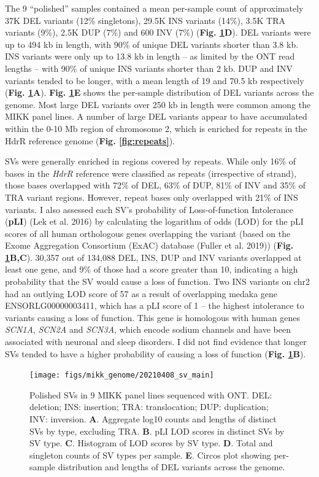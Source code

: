 \documentclass[
]{book}
\begin{document}
The 9 ``polished'' samples contained a mean per-sample count of approximately 37K DEL variants (12\% singletons), 29.5K INS variants (14\%), 3.5K TRA variants (9\%), 2.5K DUP (7\%) and 600 INV (7\%) (\textbf{Fig. \ref{fig:SV-main}D}). DEL variants were up to 494 kb in length, with 90\% of unique DEL variants shorter than 3.8 kb. INS variants were only up to 13.8 kb in length -- as limited by the ONT read lengths -- with 90\% of unique INS variants shorter than 2 kb. DUP and INV variants tended to be longer, with a mean length of 19 and 70.5 kb respectively (\textbf{Fig. \ref{fig:SV-main}A}). \textbf{Fig. \ref{fig:SV-main}E} shows the per-sample distribution of DEL variants across the genome. Most large DEL variants over 250 kb in length were common among the MIKK panel lines. A number of large DEL variants appear to have accumulated within the 0-10 Mb region of chromosome 2, which is enriched for repeats in the HdrR reference genome (\textbf{Fig. \ref{fig:repeats}}).

SVs were generally enriched in regions covered by repeats. While only 16\% of bases in the \emph{HdrR} reference were classified as repeats (irrespective of strand), those bases overlapped with 72\% of DEL, 63\% of DUP, 81\% of INV and 35\% of TRA variant regions. However, repeat bases only overlapped with 21\% of INS variants. I also assessed each SV's probability of Loss-of-function Intolerance (\textbf{pLI}) (Lek et al. 2016) by calculating the logarithm of odds (LOD) for the pLI scores of all human orthologous genes overlapping the variant (based on the Exome Aggregation Consortium (ExAC) database (Fuller et al. 2019)) (\textbf{Fig. \ref{fig:SV-main}B,C}). 30,357 out of 134,088 DEL, INS, DUP and INV variants overlapped at least one gene, and 9\% of those had a score greater than 10, indicating a high probability that the SV would cause a loss of function. Two INS variants on chr2 had an outlying LOD score of 57 as a result of overlapping medaka gene ENSORLG00000003411, which has a pLI score of 1 -- the highest intolerance to variants causing a loss of function. This gene is homologous with human genes \emph{SCN1A}, \emph{SCN2A} and \emph{SCN3A}, which encode sodium channels and have been associated with neuronal and sleep disorders. I did not find evidence that longer SVs tended to have a higher probability of causing a loss of function (\textbf{Fig. \ref{fig:SV-main}B}).



\begin{figure}
\texttt{[image: figs/mikk\_genome/20210408\_sv\_main]} \caption{Polished SVs in 9 MIKK panel lines sequenced with ONT. DEL: deletion; INS: insertion; TRA: translocation; DUP: duplication; INV: inversion. \textbf{A}. Aggregate log10 counts and lengths of distinct SVs by type, excluding TRA. \textbf{B}. pLI LOD scores in distinct SVs by SV type. \textbf{C}. Histogram of LOD scores by SV type. \textbf{D}. Total and singleton counts of SV types per sample. \textbf{E}. Circos plot showing per-sample distribution and lengths of DEL variants across the genome.}\label{fig:SV-main}
\end{figure}
\end{document}
